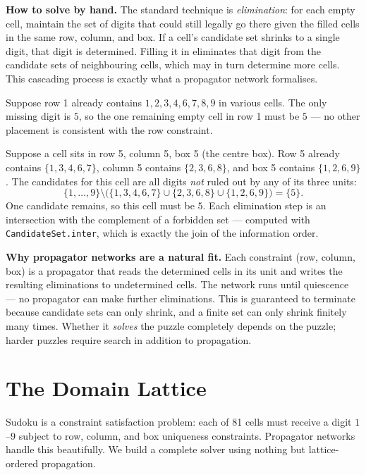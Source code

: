 \documentclass[12pt, a4paper, openright]{book}
\theoremstyle{thmstyle}
\theoremstyle{defstyle}
\newcommand{\lc}[1]{\texttt{#1}}
\newenvironment{exbox}[1][]{%
  \begin{tcolorbox}[exbox, title={Example\ifx\\#1\\\else\ --- #1\fi}]%
}{\end{tcolorbox}}
\begin{document}
\textbf{How to solve by hand.}
The standard technique is \emph{elimination}: for each empty cell, maintain the
set of digits that could still legally go there given the filled cells in the
same row, column, and box. If a cell's candidate set shrinks to a single digit,
that digit is determined. Filling it in eliminates that digit from the candidate
sets of neighbouring cells, which may in turn determine more cells. This
cascading process is exactly what a propagator network formalises.

\begin{exbox}[A simple deduction]
  Suppose row 1 already contains $1, 2, 3, 4, 6, 7, 8, 9$ in various cells.
  The only missing digit is $5$, so the one remaining empty cell in row 1
  must be $5$ --- no other placement is consistent with the row constraint.
\end{exbox}

\begin{exbox}[Elimination across constraints]
  Suppose a cell sits in row 5, column 5, box 5 (the centre box). Row 5 already
  contains $\{1,3,4,6,7\}$, column 5 contains $\{2,3,6,8\}$, and box 5 contains
  $\{1,2,6,9\}$. The candidates for this cell are all digits \emph{not} ruled
  out by any of its three units:
  $$\{1,\ldots,9\} \setminus \bigl(\{1,3,4,6,7\} \cup \{2,3,6,8\}
    \cup \{1,2,6,9\}\bigr) = \{5\}.$$
  One candidate remains, so this cell must be $5$. Each elimination step is
  an intersection with the complement of a forbidden set --- computed with
  \lc{CandidateSet.inter}, which is exactly the join of the information
  order.
\end{exbox}

\textbf{Why propagator networks are a natural fit.}
Each constraint (row, column, box) is a propagator that reads the determined
cells in its unit and writes the resulting eliminations to undetermined cells.
The network runs until quiescence --- no propagator can make further
eliminations. This is guaranteed to terminate because candidate sets can only
shrink, and a finite set can only shrink finitely many times. Whether it
\emph{solves} the puzzle completely depends on the puzzle; harder puzzles
require search in addition to propagation.

\section{The Domain Lattice}

Sudoku is a constraint satisfaction problem: each of 81 cells must receive a
digit $1$--$9$ subject to row, column, and box uniqueness constraints.
Propagator networks handle this beautifully. We build a complete solver
using nothing but lattice-ordered propagation.
\end{document}
